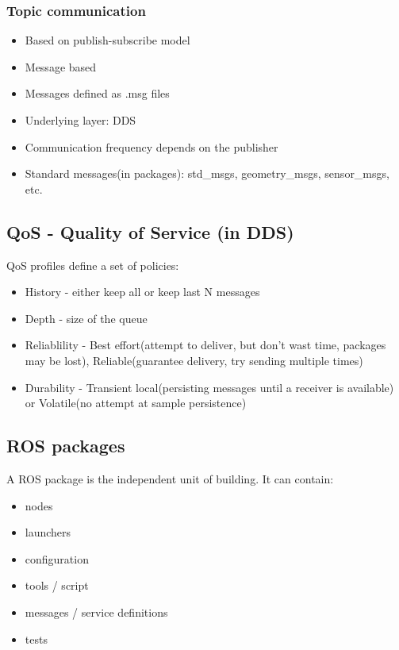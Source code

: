 \subsubsection{Topic communication}
\begin{itemize}
        \item Based on publish-subscribe model
        \item Message based
        \item Messages defined as .msg files
        \item Underlying layer: DDS
        \item Communication frequency depends on the publisher
        \item Standard messages(in packages): std\_msgs, geometry\_msgs, sensor\_msgs, etc.
\end{itemize}



\subsection{QoS - Quality of Service (in DDS)}
QoS profiles define a set of policies:
\begin{itemize}
    \item History - either keep all or keep last N messages
    \item Depth - size of the queue
    \item Reliablility - Best effort(attempt to deliver, but don't wast time, packages may be lost), Reliable(guarantee delivery, try sending multiple times)
    \item Durability - Transient local(persisting messages until a receiver is available) or Volatile(no attempt at sample persistence)
\end{itemize}

\subsection{ROS packages}
A ROS package is the independent unit of building. It can contain:
\begin{itemize}
    \item nodes
    \item launchers
    \item configuration
    \item tools / script
    \item messages / service definitions
    \item tests
\end{itemize}
